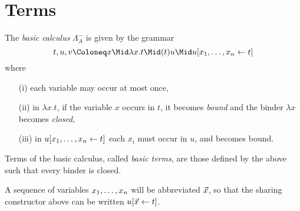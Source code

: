 \documentclass{amsart}
\begin{document}
\section*{Terms}

\begin{definition}
\label{def:basic calculus}
The \emph{basic calculus} $\Lambda_A^-$ is given by the grammar
%
\setMidspace{6pt}
%
\[
t,u,v \Coloneq x
	\Mid		\lambda x.t 
	\Mid		(t)u
	\Mid		u\share xt
\]
%
where
\begin{itemize}
	\item[(i)] each variable may occur at most once, 
	\item[(ii)] in $\lambda x.t$, if the variable $x$ occurs in $t$, it becomes \emph{bound} and the binder $\lambda x$ becomes \emph{closed},
	\item[(iii)] in $u\share xt$ each $x_i$ must occur in $u$, and becomes bound.
\end{itemize}
%
Terms of the basic calculus, called \emph{basic terms}, are those defined by the above such that every binder is closed.
\end{definition}


A sequence of variables $\vv x$ will be abbreviated $\vv*x$, so that the sharing constructor above can be written $u\share*{\vv*x}t$.
\end{document}
